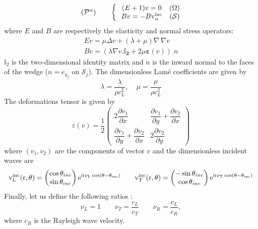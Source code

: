 \begin{equation}
(\mathcal{P}^{\alpha}) \hspace{2em} \left\{~~
\begin{matrix}
(E+1)v=0 & (\Omega) \\
Bv=-B \rm v_{\alpha}^{inc} & (\mathcal{S})
\end{matrix}
\right.
\label{Padim}
\end{equation}
where $E$ and $B$ are respectively the elasticity and normal stress operators:
\begin{gather}
Ev=\mu \Delta v +(\lambda+\mu) \nabla \, \nabla v \label{defE}\\
Bv=(\lambda \nabla v .\mathbf{\mathbb{I}_2}+2\mu \mathbf{\varepsilon} (v)).n\label{defB}
\end{gather}
$\mathbb{I}_2$ is the two-dimensional identity matrix and $n$ is the inward normal to the faces of the wedge ($n=e_{y_j}$ on $\mathcal{S}_j$). The dimensionless Lam\'{e} coefficients are given by
\begin{equation}
\lambda=\frac{\underline{\lambda}}{\rho c_L^2}, \; \; \; \; \mu=\frac{\underline{\mu}}{\rho c_L^2}
\label{LameAdim}
\end{equation}
The deformations tensor is given by 
\begin{equation}
\varepsilon(v)=\dfrac{1}{2}\begin{pmatrix}
2\dfrac{\partial v_1}{\partial x} & \dfrac{\partial v_1}{\partial y}+\dfrac{\partial v_2}{\partial x} \\
\dfrac{\partial v_1}{\partial y}+\dfrac{\partial v_2}{\partial x}& 2\dfrac{\partial v_2}{\partial y}
\end{pmatrix}
\end{equation}
where $(v_1,v_2)$ are the components of vector $v$ and the dimensionless incident waves are
\begin{equation}
\rm v_L^{inc}(r,\theta)=\begin{pmatrix}
\cos \theta_{inc} \\
\sin \theta_{inc}
\end{pmatrix} e^{ir\nu_L \cos(\theta-\theta_{inc})}
\hspace{2em}
\rm v_T^{inc}(r,\theta)=\begin{pmatrix}
-\sin \theta_{inc} \\
\cos \theta_{inc}
\end{pmatrix} e^{ir\nu_T \cos(\theta-\theta_{inc})} 
\end{equation}
Finally, let us define the following ratios :
\begin{equation}
\nu_L=1 \hspace{2em} \nu_T=\frac{c_L}{c_T} \hspace{2em} \nu_R=\frac{c_L}{c_R} ,
\label{nuLnuT}
\end{equation}
where $c_R$ is the Rayleigh wave velocity.


